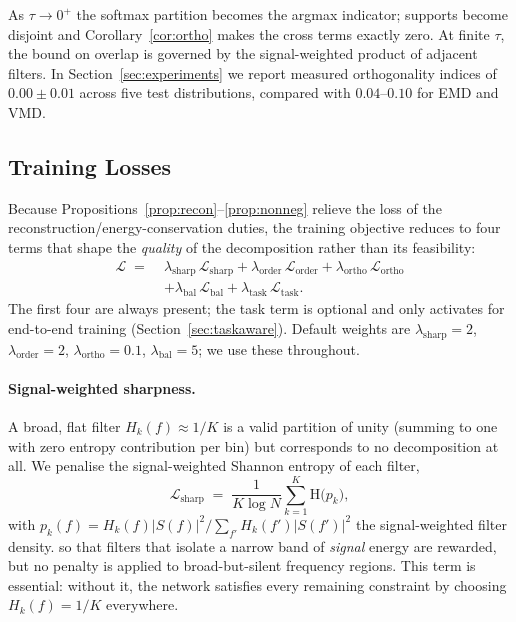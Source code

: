 \documentclass[journal]{IEEEtran}
\theoremstyle{remark}
\begin{document}
As $\tau \to 0^{+}$ the softmax partition becomes the argmax indicator;
supports become disjoint and Corollary~\ref{cor:ortho} makes the cross
terms exactly zero. At finite $\tau$, the bound on overlap is governed
by the signal-weighted product of adjacent filters. In
Section~\ref{sec:experiments} we report measured orthogonality indices
of $0.00 \pm 0.01$ across five test distributions, compared with
$0.04$--$0.10$ for EMD and VMD.

\subsection{Training Losses}
\label{subsec:loss}

Because Propositions~\ref{prop:recon}--\ref{prop:nonneg} relieve the
loss of the reconstruction/energy-conservation duties, the training
objective reduces to four terms that shape the \emph{quality} of the
decomposition rather than its feasibility:
\begin{equation}
\begin{split}
\mathcal{L} \;=\;&
 \lambda_{\mathrm{sharp}}\,\mathcal{L}_{\mathrm{sharp}}
+\lambda_{\mathrm{order}}\,\mathcal{L}_{\mathrm{order}}
+\lambda_{\mathrm{ortho}}\,\mathcal{L}_{\mathrm{ortho}} \\
&+\lambda_{\mathrm{bal}}\,\mathcal{L}_{\mathrm{bal}}
+\lambda_{\mathrm{task}}\,\mathcal{L}_{\mathrm{task}} .
\end{split}
\label{eq:total-loss}
\end{equation}
The first four are always present; the task term is optional and only
activates for end-to-end training (Section~\ref{sec:taskaware}).
Default weights are $\lambda_{\mathrm{sharp}}=2$,
$\lambda_{\mathrm{order}}=2$, $\lambda_{\mathrm{ortho}}=0.1$,
$\lambda_{\mathrm{bal}}=5$; we use these throughout.

\paragraph{Signal-weighted sharpness.}
A broad, flat filter $H_{k}(f) \approx 1/K$ is a valid partition of
unity (summing to one with zero entropy contribution per bin) but
corresponds to no decomposition at all. We penalise the signal-weighted
Shannon entropy of each filter,
\begin{equation}
\mathcal{L}_{\mathrm{sharp}} \;=\; \frac{1}{K\log N}
  \sum_{k=1}^{K}
  \mathrm{H}\!\bigl(p_{k}\bigr),
\label{eq:sharp}
\end{equation}
with $p_{k}(f) = H_{k}(f)\lvert S(f)\rvert^{2}
  / \sum_{f'} H_{k}(f')\lvert S(f')\rvert^{2}$ the
signal-weighted filter density.
so that filters that isolate a narrow band of \emph{signal} energy are
rewarded, but no penalty is applied to broad-but-silent frequency
regions. This term is essential: without it, the network satisfies
every remaining constraint by choosing $H_{k}(f) = 1/K$ everywhere.
\end{document}
